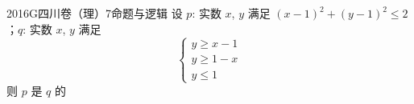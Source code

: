 
\begin{problem}{2016}{G}{四川卷（理）}{7}{命题与逻辑}
设 $ p $: 实数 $ x $, $ y $ 满足 $ (x-1)^2+(y-1)^2\leqslant 2 $；$ q $: 实数 $ x $, $ y $ 满足
$$
\begin{cases}
y\geqslant x-1\\
y\geqslant 1-x\\
y\leqslant 1
\end{cases}
$$
则 $ p $ 是 $ q $ 的
\begin{choices}
\end{choices}
\end{problem}

\begin{answer}

\end{answer}

\begin{solutions}

\end{solutions}